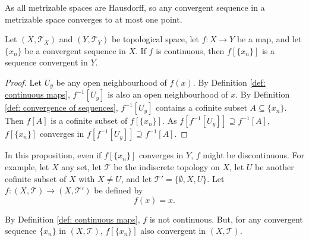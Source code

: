 \begin{note}
	As all metrizable spaces are Hausdorff, so any convergent sequence in a metrizable space converges to at most one point.
\end{note}


\begin{proposition}
	Let $(X, \mathcal T_X)$ and $(Y, \mathcal T_Y)$ be topological space, let $f: X \to Y$ be a map, and let $\{x_n\}$ be a convergent sequence in $X$. If $f$ is continuous, then $f[\{x_n\}]$ is a sequence convergent in $Y$.
	
	\begin{proof}
		Let $U_y$ be any open neighbourhood of $f(x)$. By Definition \ref{def: continuous maps}, $f^{-1}[U_y]$ is also an open neighbourhood of $x$. By Definition \ref{def: convergence of sequences}, $f^{-1}[U_y]$ contains a cofinite subset $A \subseteq \{x_n\}$. Then $f[A]$ is a cofinite subset of $f[\{x_n\}]$. As $f[f^{-1}[U_y]] \supseteq f^{-1}[A]$, $f[\{x_n\}]$ converges in $f[f^{-1}[U_y]] \supseteq f^{-1}[A]$.
	\end{proof}		
\end{proposition}


\begin{note}
	In this proposition, even if $f[\{x_n\}]$ converges in $Y$, $f$ might be discontinuous. For example, let $X$ any set, let $\mathcal T$ be the indiscrete topology on $X$, let $U$ be another cofinite subset of $X$ with $X \ne U$, and let $\mathcal T' = \{ \emptyset, X, U\}$. Let $f: (X, \mathcal T) \to (X, \mathcal T')$ be defined by
	$$
	f(x) = x.
	$$
	
	By Definition \ref{def: continuous maps}, $f$ is not continuous. But, for any convergent sequence $\{x_n\}$ in $(X, \mathcal T)$, $f[\{x_n\}]$ also convergent in $(X, \mathcal T)$.
\end{note}





































%